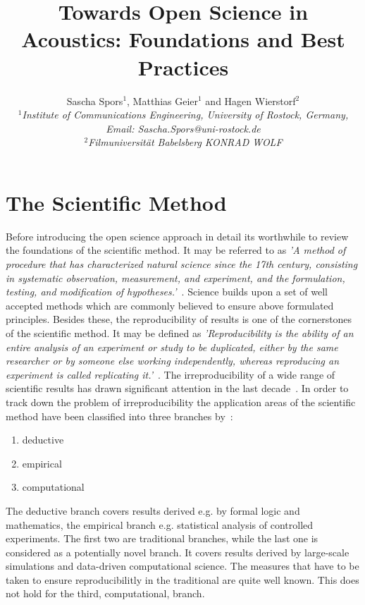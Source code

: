 \documentclass[a4paper, 10pt, twocolumn]{article}
\date{}                                         %
\title{\vspace{-8mm}\textbf{\large
Towards Open Science in Acoustics: Foundations and Best Practices}}
\author{
Sascha Spors$^1$, Matthias Geier$^1$ and Hagen Wierstorf$^2$\\
$^1$\emph{\small Institute of Communications Engineering, University of Rostock, Germany, Email: Sascha.Spors@uni-rostock.de}\\
$^2$\emph{\small Filmuniversität Babelsberg KONRAD WOLF}}
\begin{document}
\maketitle
\thispagestyle{empty}           %

\section*{The Scientific Method} \label{sec:intro} 

Before introducing the open science approach in detail its worthwhile to review the
foundations of the scientific method. It may be referred to  as 
\emph{'A method of procedure that has characterized natural science since the 17th 
century, consisting in systematic observation, measurement, and experiment, and the 
formulation, testing, and modification of hypotheses.'}~\cite{scientific_method:OXD}. 
Science builds upon a set of well accepted methods which are commonly believed to
ensure above formulated principles. Besides these, the reproducibility of results is 
one of the cornerstones of the scientific method. 
It may be defined as \emph{'Reproducibility is the ability of an entire analysis of 
an experiment or study to be duplicated, either by the same researcher or by someone 
else working independently, whereas reproducing an experiment is called replicating 
it.'}~\cite{Leek15:PNAS}. 
The irreproducibility of a wide range of scientific results has drawn significant 
attention in the last decade~\cite{Borgwardt:Book,retraction:WWW,ioannidis05:PLOS, open15:AAAS, chalmers09:OG, freedman15:PLOS, howells14:Nature}. 
In order to track down the problem of irreproducibility the application areas of 
the scientific method have been classified into three branches by~\cite{Donoho:CSE,Stodden2014:talk}:
\begin{enumerate}
\item deductive
\item empirical
\item computational
\end{enumerate}
The deductive branch covers results derived e.g. by formal logic and mathematics, the empirical
branch e.g. statistical analysis of controlled experiments. The first two are traditional branches, 
while the last one is considered as a potentially novel branch. It covers results derived by large-scale simulations
and data-driven computational science. The measures that have to be taken to ensure reproducibilitly
in the traditional are quite well known. This does not hold for the third, computational, branch.
\end{document}

